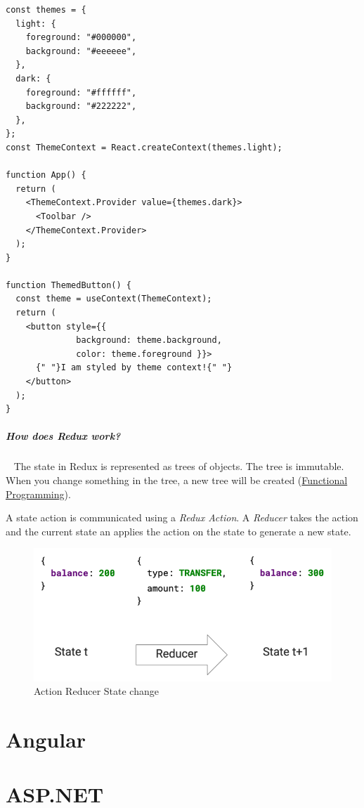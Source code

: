 \documentclass[11pt,twoside,landscape]{article}
\begin{document}
\begin{multicols}{3}
\begin{verbatim}
const themes = {
  light: {
    foreground: "#000000",
    background: "#eeeeee",
  },
  dark: {
    foreground: "#ffffff",
    background: "#222222",
  },
};
const ThemeContext = React.createContext(themes.light);

function App() {
  return (
    <ThemeContext.Provider value={themes.dark}>
      <Toolbar />
    </ThemeContext.Provider>
  );
}

function ThemedButton() {
  const theme = useContext(ThemeContext);
  return (
    <button style={{
              background: theme.background,
              color: theme.foreground }}>
      {" "}I am styled by theme context!{" "}
    </button>
  );
}
\end{verbatim}
\subparagraph{How does Redux work?} \
\label{sec:orgdfbc521}
The state in Redux is represented as trees of objects.
The tree is immutable.
When you change something in the tree, a new tree will be created (\href{../../../roam/20220616080932-functional_programming.org}{Functional Programming}).

A state action is communicated using a \emph{Redux Action}.
A \emph{Reducer} takes the action and the current state an applies the action on the state to generate a new state.

\begin{figure}[htbp]
\centering
\includegraphics[width=.9\linewidth]{img/redux_action_reducer.png}
\caption{\label{fig:action-reducer-state-change}Action Reducer State change}
\end{figure}
\section{Angular}
\label{sec:orgc174dc9}
\section{ASP.NET}
\label{sec:org54f4898}


\end{multicols}
\end{document}
